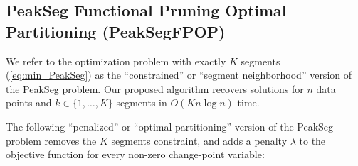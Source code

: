 \documentclass{article}
\begin{document}

\subsection{PeakSeg Functional Pruning Optimal Partitioning (PeakSegFPOP)}

We refer to the optimization problem with exactly $K$ segments
(\ref{eq:min_PeakSeg}) as the ``constrained'' or ``segment
neighborhood'' version of the PeakSeg problem. Our proposed algorithm
recovers solutions for $n$ data points and $k\in\{1,\dots,K\}$
segments in $O(K n \log n)$ time.

The following ``penalized'' or ``optimal partitioning'' version of the
PeakSeg problem removes the $K$ segments constraint, and adds a
penalty $\lambda$ to the objective function for every non-zero
change-point variable:
\end{document}
